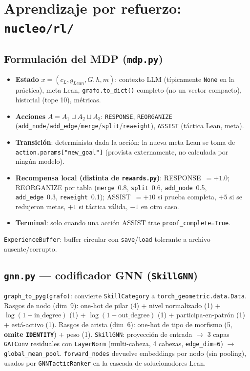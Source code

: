 \documentclass[11pt,a4paper]{report}
\newcommand{\code}[1]{\texttt{#1}}
\begin{document}
\chapter{Aprendizaje por refuerzo: \code{nucleo/rl/}}
\label{ch:rl}

\section{Formulaci\'on del MDP (\code{mdp.py})}

\begin{itemize}
  \item \textbf{Estado} $x=(c_L,g_{Lean},G,h,m)$: contexto LLM (t\'ipicamente \code{None} en la pr\'actica), meta Lean, \code{grafo.to_dict()} completo (no un vector compacto), historial (tope 10), m\'etricas.
  \item \textbf{Acciones} $A=A_1\sqcup A_2\sqcup A_3$: \code{RESPONSE}, \code{REORGANIZE} (\code{add_node}/\code{add_edge}/\code{merge}/\code{split}/\code{reweight}), \code{ASSIST} (t\'actica Lean, meta).
  \item \textbf{Transici\'on}: determinista dada la acci\'on; la nueva meta Lean se toma de \code{action.params["new\_goal"]} (provista externamente, no calculada por ning\'un modelo).
  \item \textbf{Recompensa local (distinta de \code{rewards.py})}: RESPONSE~$=+1.0$; REORGANIZE por tabla (\code{merge}~0.8, \code{split}~0.6, \code{add\_node}~0.5, \code{add\_edge}~0.3, \code{reweight}~0.1); ASSIST~$=+10$ si prueba completa, $+5$ si se redujeron metas, $+1$ si t\'actica v\'alida, $-1$ en otro caso.
  \item \textbf{Terminal}: solo cuando una acci\'on ASSIST trae \code{proof_complete=True}.
\end{itemize}
\code{ExperienceBuffer}: buffer circular con \code{save}/\code{load} tolerante a archivo ausente/corrupto.

\section{\code{gnn.py} --- codificador GNN (\code{SkillGNN})}

\code{graph_to_pyg(grafo)}: convierte \code{SkillCategory} a \code{torch_geometric.data.Data}. Rasgos de nodo (dim~9): one-hot de pilar (4) + nivel normalizado (1) + $\log(1+\text{in\_degree})$ (1) + $\log(1+\text{out\_degree})$ (1) + participa-en-patr\'on (1) + est\'a-activo (1). Rasgos de arista (dim~6): one-hot de tipo de morfismo (5, \textbf{omite \code{IDENTITY}}) + peso (1). \code{SkillGNN}: proyecci\'on de entrada $\to$ 3 capas \code{GATConv} residuales con \code{LayerNorm} (multi-cabeza, 4 cabezas, \code{edge\_dim=6}) $\to$ \code{global_mean_pool}. \code{forward_nodes} devuelve embeddings por nodo (sin pooling), usados por \code{GNNTacticRanker} en la cascada de solucionadores Lean.
\end{document}
